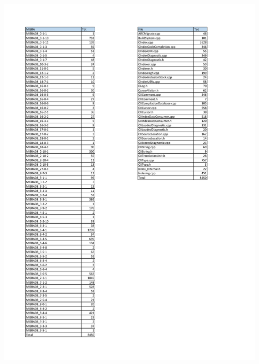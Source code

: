 \begin{minipage}{\linewidth}
	\includegraphics[width=\textwidth]{pdf/Misra_Summary.pdf}
\end{minipage}

\pagebreak

